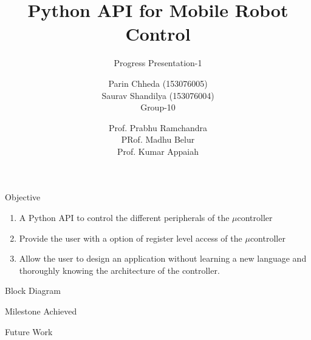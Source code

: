 \documentclass[10pt,handout,english]{beamer}
\title[] %
{Python API for Mobile Robot Control}
\subtitle{Progress Presentation-1}
\author[AE-663 Course Project ] %
{Parin Chheda (153076005) \\ Saurav Shandilya (153076004) \\ Group-10 }
\institute [Indian Institute of Technology Bombay]%
{
  
}
\date[\today] %
{Prof. Prabhu Ramchandra \\ PRof. Madhu Belur \\ Prof. Kumar Appaiah}
\begin{document}
\frame{\titlepage}

\begin{frame}{Objective}
\begin{enumerate}
	\item A Python API to control the different peripherals of the ${\mu}$controller
	\item Provide the user with a option of register level access of the ${\mu}$controller
	\item Allow the user to design an application without learning a new language and thoroughly knowing the architecture of the controller.
\end{enumerate}
\end{frame}

\begin{frame}{Block Diagram}

\end{frame}

\begin{frame}{Milestone Achieved}

\end{frame}

\begin{frame}{Future Work}

\end{frame}
\end{document}
